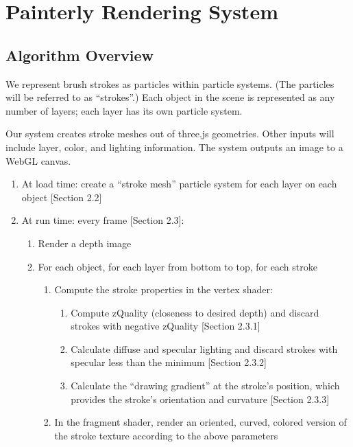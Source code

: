 \documentclass[conference]{acmsiggraph}
\begin{document}
\section{Painterly Rendering System}

\subsection{Algorithm Overview}

We represent brush strokes as particles within particle systems. (The particles
will be referred to as ``strokes''.) Each object in the scene is represented as
any number of layers; each layer has its own particle system.

Our system creates stroke meshes out of three.js geometries. Other inputs will
include layer, color, and lighting information. The system outputs an image to
a WebGL canvas.

\begin{enumerate}
  \item At load time: create a ``stroke mesh'' particle system for each layer
    on each object {[}Section 2.2{]}

  \item At run time: every frame {[}Section 2.3{]}:

      \begin{enumerate}
        \item Render a depth image
        \item For each object, for each layer from bottom to top, for each
          stroke

          \begin{enumerate}
            \item Compute the stroke properties in the vertex shader:

              \begin{enumerate}
                \item Compute zQuality (closeness to desired depth) and discard
                  strokes with negative zQuality {[}Section 2.3.1{]}
                \item Calculate diffuse and specular lighting and discard
                  strokes with specular less than the minimum
                  {[}Section 2.3.2{]}
                \item Calculate the ``drawing gradient'' at the stroke's
                  position, which provides the stroke's orientation and
                  curvature {[}Section 2.3.3{]}
              \end{enumerate}

            \item In the fragment shader, render an oriented, curved, colored
              version of the stroke texture according to the above parameters

          \end{enumerate}

      \end{enumerate}

\end{enumerate}
\end{document}
